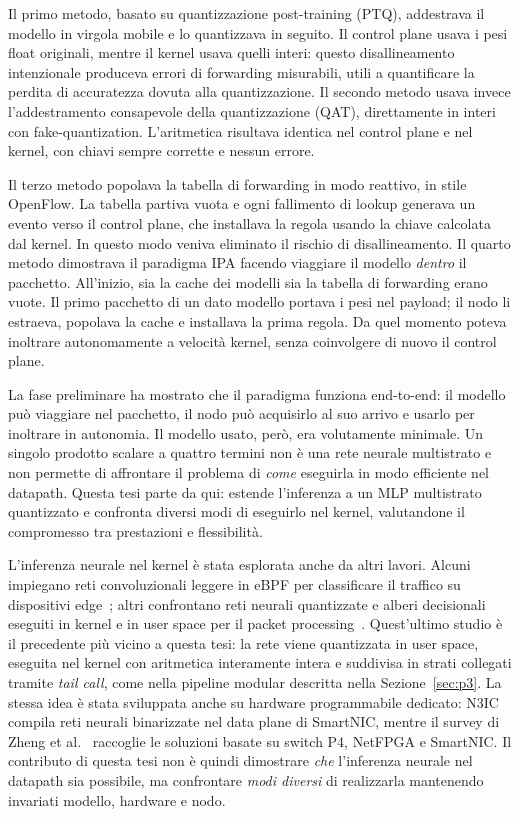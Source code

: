 \documentclass[binding=0.6cm,italian,oneside,noexaminfo]{sapthesis}
\begin{document}
Il primo metodo, basato su quantizzazione post-training (PTQ), addestrava il modello in virgola mobile e lo quantizzava in seguito. Il control plane usava i pesi float originali, mentre il kernel usava quelli interi: questo disallineamento intenzionale produceva errori di forwarding misurabili, utili a quantificare la perdita di accuratezza dovuta alla quantizzazione. Il secondo metodo usava invece l'addestramento consapevole della quantizzazione (QAT), direttamente in interi con fake-quantization. L'aritmetica risultava identica nel control plane e nel kernel, con chiavi sempre corrette e nessun errore.

Il terzo metodo popolava la tabella di forwarding in modo reattivo, in stile OpenFlow. La tabella partiva vuota e ogni fallimento di lookup generava un evento verso il control plane, che installava la regola usando la chiave calcolata dal kernel. In questo modo veniva eliminato il rischio di disallineamento. Il quarto metodo dimostrava il paradigma IPA facendo viaggiare il modello \emph{dentro} il pacchetto. All'inizio, sia la cache dei modelli sia la tabella di forwarding erano vuote. Il primo pacchetto di un dato modello portava i pesi nel payload; il nodo li estraeva, popolava la cache e installava la prima regola. Da quel momento poteva inoltrare autonomamente a velocità kernel, senza coinvolgere di nuovo il control plane.

La fase preliminare ha mostrato che il paradigma funziona end-to-end: il modello può viaggiare nel pacchetto, il nodo può acquisirlo al suo arrivo e usarlo per inoltrare in autonomia. Il modello usato, però, era volutamente minimale. Un singolo prodotto scalare a quattro termini non è una rete neurale multistrato e non permette di affrontare il problema di \emph{come} eseguirla in modo efficiente nel datapath. Questa tesi parte da qui: estende l'inferenza a un MLP multistrato quantizzato e confronta diversi modi di eseguirlo nel kernel, valutandone il compromesso tra prestazioni e flessibilità.

L'inferenza neurale nel kernel è stata esplorata anche da altri lavori. Alcuni impiegano reti convoluzionali leggere in eBPF per classificare il traffico su dispositivi edge~\cite{cnnkernel2025}; altri confrontano reti neurali quantizzate e alberi decisionali eseguiti in kernel e in user space per il packet processing~\cite{nntree2024}. Quest'ultimo studio è il precedente più vicino a questa tesi: la rete viene quantizzata in user space, eseguita nel kernel con aritmetica interamente intera e suddivisa in strati collegati tramite \emph{tail call}, come nella pipeline modular descritta nella Sezione~\ref{sec:p3}. La stessa idea è stata sviluppata anche su hardware programmabile dedicato: N3IC~\cite{n3ic2022} compila reti neurali binarizzate nel data plane di SmartNIC, mentre il survey di Zheng et al.~\cite{inmlsurvey2024} raccoglie le soluzioni basate su switch P4, NetFPGA e SmartNIC. Il contributo di questa tesi non è quindi dimostrare \emph{che} l'inferenza neurale nel datapath sia possibile, ma confrontare \emph{modi diversi} di realizzarla mantenendo invariati modello, hardware e nodo.
\end{document}
